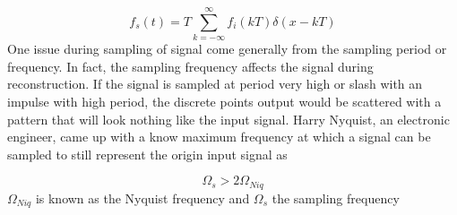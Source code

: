 \documentclass[12pt,letterpaper]{article}
\begin{document}
\begin{equation}
    f_s(t)=T\sum_{k=-\infty}^{\infty} f_i(kT)\delta(x-kT)
\end{equation}
One issue during sampling of signal come generally from the sampling period or frequency. In fact, the sampling 
frequency affects the signal during reconstruction. If the signal is sampled at period very high or slash with 
an impulse with high period, the discrete points output would be scattered with a pattern that will look nothing like
the input signal. Harry Nyquist, an electronic engineer, came up with a know maximum frequency at which a 
signal can be sampled to still represent the origin input signal as 

\begin{equation}
    \Omega_s > 2\Omega_{Niq}
\end{equation}
\(\Omega_{Niq}\) is known as the Nyquist frequency and \(\Omega_s \) the sampling frequency
\end{document}
